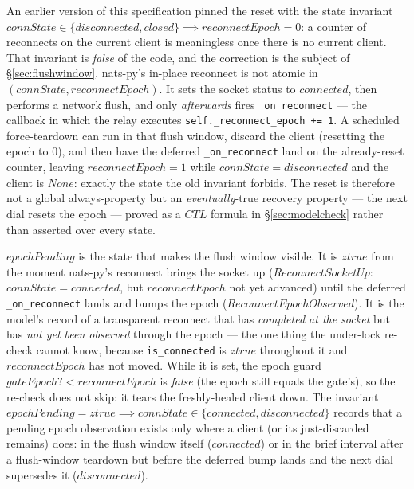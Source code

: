 \documentclass[a4paper,10pt,fleqn]{article}
\begin{document}
An earlier version of this specification pinned the reset with the state
invariant $connState \in \{ disconnected, closed \} \implies
reconnectEpoch = 0$: a counter of reconnects on the current client is
meaningless once there is no current client.  That invariant is
\emph{false} of the code, and the correction is the subject of
\S\ref{sec:flushwindow}.  nats-py's in-place reconnect is not atomic in
$(connState, reconnectEpoch)$.  It sets the socket status to $connected$,
then performs a network flush, and only \emph{afterwards} fires
\texttt{\_on\_reconnect} --- the callback in which the relay executes
\texttt{self.\_reconnect\_epoch += 1}.  A scheduled force-teardown can
run in that flush window, discard the client (resetting the epoch to
$0$), and then have the deferred \texttt{\_on\_reconnect} land on the
already-reset counter, leaving $reconnectEpoch = 1$ while $connState =
disconnected$ and the client is $None$: exactly the state the old
invariant forbids.  The reset is therefore not a global always-property
but an \emph{eventually}-true recovery property --- the next dial resets
the epoch --- proved as a $CTL$ formula in \S\ref{sec:modelcheck} rather
than asserted over every state.

$epochPending$ is the state that makes the flush window visible.  It is
$ztrue$ from the moment nats-py's reconnect brings the socket up
($ReconnectSocketUp$: $connState = connected$, but $reconnectEpoch$ not
yet advanced) until the deferred \texttt{\_on\_reconnect} lands and bumps
the epoch ($ReconnectEpochObserved$).  It is the model's record of a
transparent reconnect that has \emph{completed at the socket} but has
\emph{not yet been observed} through the epoch --- the one thing the
under-lock re-check cannot know, because \texttt{is\_connected} is $ztrue$
throughout it and $reconnectEpoch$ has not moved.  While it is set, the
epoch guard $gateEpoch? < reconnectEpoch$ is \emph{false} (the epoch still
equals the gate's), so the re-check does not skip: it tears the
freshly-healed client down.  The invariant $epochPending = ztrue \implies
connState \in \{ connected, disconnected \}$ records that a pending epoch
observation exists only where a client (or its just-discarded remains)
does: in the flush window itself ($connected$) or in the brief interval
after a flush-window teardown but before the deferred bump lands and the
next dial supersedes it ($disconnected$).
\end{document}
